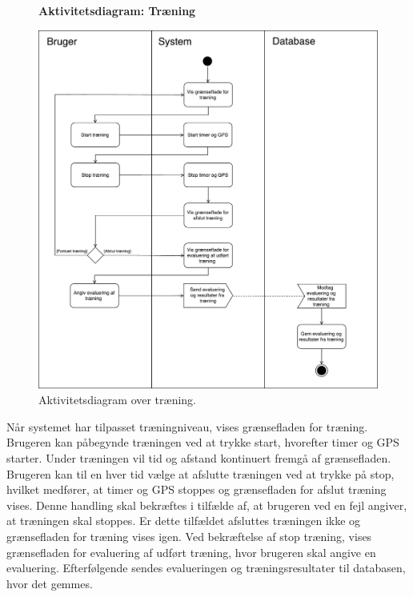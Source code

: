 \begin{figure} [H]
\centering
\textbf{Aktivitetsdiagram: Træning}\par\medskip
\includegraphics[width=1\textwidth]{figures/aktivitetsdiagram/Traening}
\caption{Aktivitetsdiagram over træning.}
\label{fig:traening}
\end{figure}

\noindent
Når systemet har tilpasset træningniveau, vises grænsefladen for træning. Brugeren kan påbegynde træningen ved at trykke start, hvorefter timer og GPS starter. Under træningen vil tid og afstand kontinuert fremgå af grænsefladen. Brugeren kan til en hver tid vælge at afslutte træningen ved at trykke på stop, hvilket medfører, at timer og GPS stoppes og grænsefladen for afslut træning vises. Denne handling skal bekræftes i tilfælde af, at brugeren ved en fejl angiver, at træningen skal stoppes. Er dette tilfældet afsluttes træningen ikke og grænsefladen for træning vises igen. Ved bekræftelse af stop træning, vises grænsefladen for evaluering af udført træning, hvor brugeren skal angive en evaluering. Efterfølgende sendes evalueringen og træningsresultater til databasen, hvor det gemmes.

